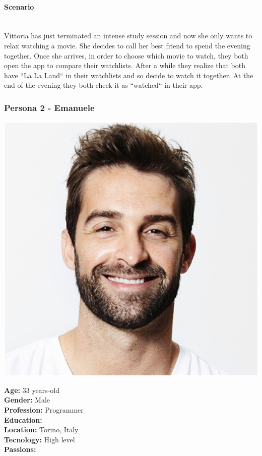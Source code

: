 \documentclass[12pt, a4paper]{article}
\begin{document}
\paragraph{Scenario}\mbox{}\\
Vittoria has just terminated an intense study session and now she only wants to 
relax watching a movie. She decides to call her best friend to spend the evening together. 
Once she arrives, in order to choose which movie to watch, they both open the app to 
compare their watchlists. After a while they realize that both have “La La Land“ in their 
watchlists and so decide to watch it together.
At the end of the evening they both check it as “watched“ in their app. 

\subsubsection{Persona 2 - Emanuele}

\begin{minipage}{0.25\textwidth}
	\includegraphics[width=1\textwidth]{images/emanuele.png}
\end{minipage}
\hspace{0.02\linewidth}
\begin{minipage}{0.6\textwidth} 
	\textbf{Age:} 33 years-old\\
	\textbf{Gender:} Male\\
	\textbf{Profession:} Programmer\\
	\textbf{Education:} \\
	\textbf{Location:} Torino, Italy\\
	\textbf{Tecnology:} High level\\
	\textbf{Passions:} \\
\end{minipage}
\end{document}
